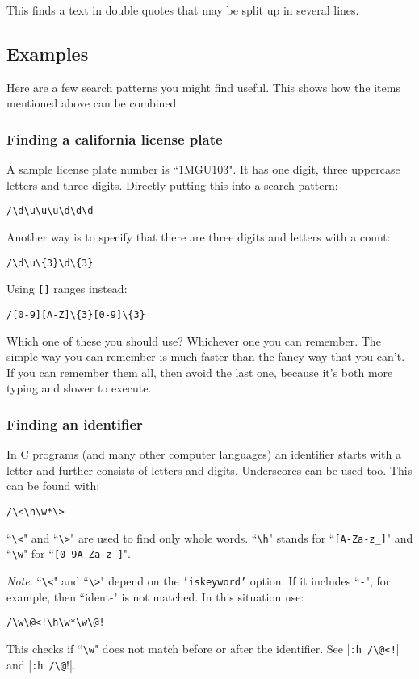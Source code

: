 This finds a text in double quotes that may be split up in several lines.
\subsection{Examples}
Here are a few search patterns you might find useful.
This shows how the items mentioned above can be combined.

\subsubsection{Finding a california license plate}
A sample license plate number is ``1MGU103".
It has one digit, three uppercase letters and three digits.
Directly putting this into a search pattern:

\begin{Verbatim}[samepage=true]
 /\d\u\u\u\d\d\d
\end{Verbatim}

Another way is to specify that there are three digits and letters with a count:

\begin{Verbatim}[samepage=true]
 /\d\u\{3}\d\{3}
\end{Verbatim}

Using \texttt{[]} ranges instead:

\begin{Verbatim}[samepage=true]
 /[0-9][A-Z]\{3}[0-9]\{3}
\end{Verbatim}

Which one of these you should use?  Whichever one you can remember.
The simple way you can remember is much faster than the fancy way that you can't.
If you can remember them all, then avoid the last one, because it's both more typing and slower to execute.

\subsubsection{Finding an identifier}
In C programs (and many other computer languages) an identifier starts with a letter and further consists of letters and digits.
Underscores can be used too.
This can be found with:

\begin{Verbatim}[samepage=true]
 /\<\h\w*\>
\end{Verbatim}

``\texttt{\textbackslash{}<}" and ``\texttt{\textbackslash{}>}" are used to find only whole words.
``\texttt{\textbackslash{}h}" stands for ``\texttt{[A-Za-z\_]}" and ``\texttt{\textbackslash{}w}" for ``\texttt{[0-9A-Za-z\_]}".

\emph{Note}:
``\texttt{\textbackslash{}<}" and ``\texttt{\textbackslash{}>}" depend on the \texttt{'iskeyword'} option.
If it includes ``\texttt{-}", for example, then ``ident-" is not matched.
In this situation use:

\begin{Verbatim}[samepage=true]
     /\w\@<!\h\w*\w\@!
\end{Verbatim}

This checks if ``\texttt{\textbackslash{}w}" does not match before or after the identifier.
See |\texttt{:h /\textbackslash{}@<!}| and |\texttt{:h /\textbackslash{}@}!|.
\clearpage
